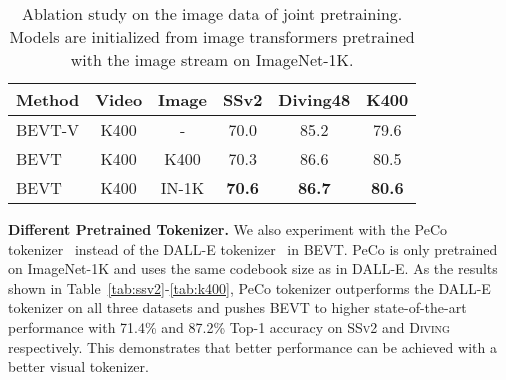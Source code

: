 \documentclass[10pt,twocolumn,letterpaper]{article}
\newcommand{\ssv}{{\scshape SSv2}\xspace}
\newcommand{\diving}{{\scshape Diving\-48}\xspace}
\newcommand{\ra}[1]{\renewcommand{\arraystretch}{#1}}
\begin{document}
\begin{table}
  \centering
  \ra{1.0}
    \setlength{\tabcolsep}{0pt} \begin{tabular*}{\linewidth}{@{\extracolsep{\fill}}lccccc@{}}
    \toprule
    Method & Video & Image & SSv2 & Diving48 & K400 \\
    \midrule
    BEVT-V & K400 & - & 70.0 & 85.2 & 79.6 \\
\midrule
BEVT & K400 & K400 & 70.3 & 86.6 & 80.5 \\
    BEVT & K400 & IN-1K & \textbf{70.6} & \textbf{86.7} & \textbf{80.6} \\
    \bottomrule
  \end{tabular*}
  \caption{Ablation study on the image data of joint pretraining. Models are initialized from image transformers pretrained with the image stream on ImageNet-1K.}
  \label{tab:pretrain_ablation}
  \vspace{-1em}
\end{table}

\vspace{0.05in}
\noindent\textbf{Different Pretrained Tokenizer.} We also experiment with the PeCo tokenizer~\cite{dong2021peco} instead of the DALL-E tokenizer~\cite{dalle} in  BEVT. PeCo is only pretrained on ImageNet-1K and uses the same codebook size as in DALL-E. 
As the results shown in Table~\ref{tab:ssv2}-\ref{tab:k400}, PeCo tokenizer outperforms the DALL-E tokenizer on all three datasets and pushes BEVT to higher state-of-the-art performance with 71.4\% and 87.2\% Top-1 accuracy on \ssv and \diving respectively. This demonstrates that better performance can be achieved with a better visual tokenizer.
\end{document}
